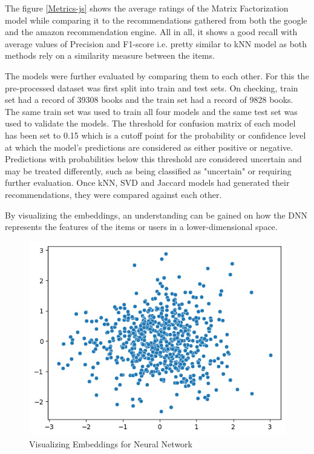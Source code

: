     The figure \ref{Metrics-js} shows the average ratings of the Matrix Factorization model while comparing it to the recommendations gathered from both the google and the amazon recommendation engine. All in all, it shows a good recall with average values of Precision and F1-score i.e. pretty similar to kNN model as both methods rely on a similarity measure between the items.

    \newpage

    
The models were further evaluated by comparing them to each other. For this the pre-processed dataset was first split into train and test sets. On checking, train set had a record of 39308 books and the train set had a record of 9828 books. The same train set was used to train all four models and the same test set was used to validate the models. The threshold for confusion matrix of each model has been set to 0.15 which is a cutoff point for the probability or confidence level at which the model's predictions are considered as either positive or negative. Predictions with probabilities below this threshold are considered uncertain and may be treated differently, such as being classified as "uncertain" or requiring further evaluation. Once kNN, SVD and Jaccard models had generated their recommendations, they were compared against each other.

By visualizing the embeddings, an understanding can be gained on how the DNN represents the features of the items or users in a lower-dimensional space.

\begin{figure}[h]
        \centering
        \includegraphics[width=1\linewidth]{img/Graphics/embeddings.png}
        \caption{Visualizing Embeddings for Neural Network}
        \label{embeddings}
    \end{figure}
    \newpage

